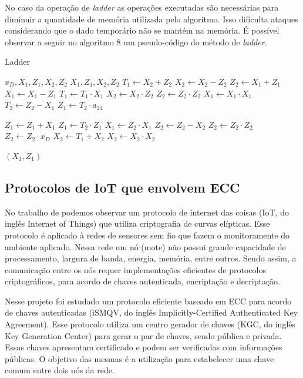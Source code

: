 No caso da operação de \textit{ladder} as operações executadas são necessárias para diminuir a quantidade de memória utilizada pelo algoritmo. Isso dificulta ataques considerando que o dado temporário não se mantém na memória. É possível observar a seguir no algoritmo 8 um pseudo-código do método de \textit{ladder}.

\begin{algorithm}[H]
\caption{Ladder}
\begin{multicols}{2}
\begin{algorithmic} 
    \REQUIRE $x_D, X_1, Z_1, X_2, Z_2$
    \ENSURE $X_1, Z_1, X_2, Z_2$
    \STATE $T_1 \leftarrow X_2 + Z_2$
    \STATE $X_2 \leftarrow X_2 - Z_2$
    \STATE $Z_2 \leftarrow X_1 + Z_1$
    \STATE $X_1 \leftarrow X_1 - Z_1$
    \STATE $T_1 \leftarrow T_1 \cdot X_1$
    \STATE $X_2 \leftarrow X_2 \cdot Z_2$
    \STATE $Z_2 \leftarrow Z_2 \cdot Z_2$
    \STATE $X_1 \leftarrow X_1 \cdot X_1$
    \STATE $T_2 \leftarrow Z_2 - X_1$
    \STATE $Z_1 \leftarrow T_2 \cdot a_24$
    
    
    \STATE $Z_1 \leftarrow Z_1 + X_1$
    \STATE $Z_1 \leftarrow T_2 \cdot Z_1$
    \STATE $X_1 \leftarrow Z_2 \cdot X_1$
    \STATE $Z_2 \leftarrow Z_2 - X_2$
    \STATE $Z_2 \leftarrow Z_2 \cdot Z_2$
    \STATE $Z_2 \leftarrow Z_2 \cdot x_D$
    \STATE $X_2 \leftarrow T_1 + X_2$
    \STATE $X_2 \leftarrow X_2 \cdot X_2$
    
    \RETURN $(X_1,Z_1)$
\end{algorithmic}
\end{multicols}
\end{algorithm}

\subsection{Protocolos de IoT que envolvem ECC}

No trabalho de \cite{SimplicioJr2016} podemos observar um protocolo de internet das coisas (IoT, do inglês Internet of Things) que utiliza criptografia de curvas elípticas. Esse protocolo é aplicado à redes de sensores sem fio que fazem o monitoramente do ambiente aplicado. Nessa rede um nó (mote) não possui grande capacidade de processamento, largura de banda, energia, memória, entre outros. Sendo assim, a comunicação entre os nós requer implementações eficientes de protocolos criptográficos, para acordo de chaves autenticada, encriptação e decriptação.

Nesse projeto foi estudado um protocolo eficiente baseado em ECC para acordo de chaves autenticadas (iSMQV, do inglês Implicitly-Certified Authenticated Key Agreement). Esse protocolo utiliza um centro gerador de chaves (KGC, do inglês Key Generation Center) para gerar o par de chaves, sendo pública e privada. Essas chaves apresentam certificado e podem ser verificadas com informações públicas. O objetivo das mesmas é a utilização para estabelecer uma chave comum entre dois nós da rede.

